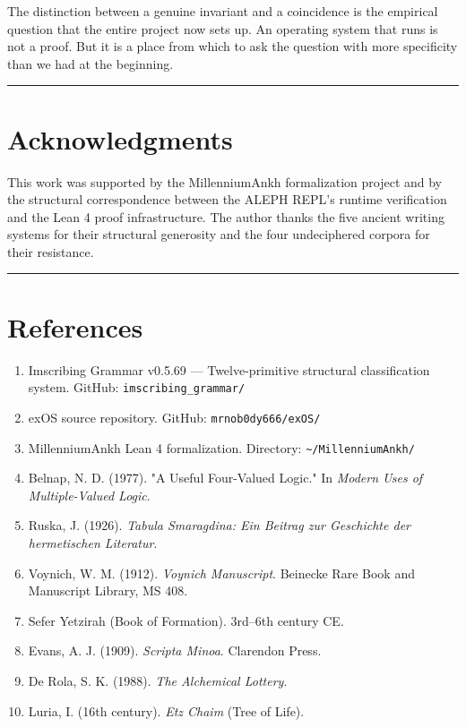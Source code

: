 \documentclass[12pt,a4paper]{article}
\begin{document}
The distinction between a genuine invariant and a coincidence is the empirical question that the entire project now sets up. An operating system that runs is not a proof. But it is a place from which to ask the question with more specificity than we had at the beginning.

\begin{center}
\rule{0.5\textwidth}{0.4pt}
\end{center}

\section{Acknowledgments}

This work was supported by the MillenniumAnkh formalization project and by the structural correspondence between the ALEPH REPL's runtime verification and the Lean 4 proof infrastructure. The author thanks the five ancient writing systems for their structural generosity and the four undeciphered corpora for their resistance.

\begin{center}
\rule{0.5\textwidth}{0.4pt}
\end{center}

\section{References}

\begin{enumerate}
    \item Imscribing Grammar v0.5.69 --- Twelve-primitive structural classification system. GitHub: \texttt{imscribing\_grammar/}
    \item exOS source repository. GitHub: \texttt{mrnob0dy666/exOS/}
    \item MillenniumAnkh Lean 4 formalization. Directory: \texttt{\textasciitilde{}/MillenniumAnkh/}
    \item Belnap, N. D. (1977). "A Useful Four-Valued Logic." In \emph{Modern Uses of Multiple-Valued Logic}.
    \item Ruska, J. (1926). \emph{Tabula Smaragdina: Ein Beitrag zur Geschichte der hermetischen Literatur}.
    \item Voynich, W. M. (1912). \emph{Voynich Manuscript}. Beinecke Rare Book and Manuscript Library, MS 408.
    \item Sefer Yetzirah (Book of Formation). 3rd--6th century CE.
    \item Evans, A. J. (1909). \emph{Scripta Minoa}. Clarendon Press.
    \item De Rola, S. K. (1988). \emph{The Alchemical Lottery}.
    \item Luria, I. (16th century). \emph{Etz Chaim} (Tree of Life).
\end{enumerate}
\end{document}
